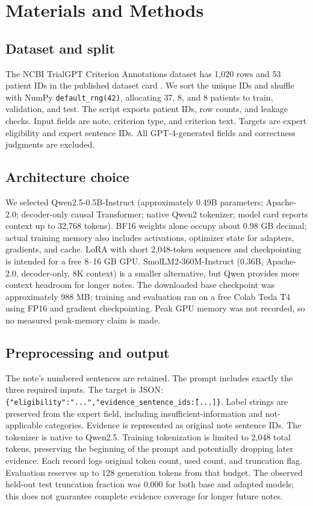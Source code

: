 \documentclass[conference]{IEEEtran}
\begin{document}
\section{Materials and Methods}
\subsection{Dataset and split}
The NCBI TrialGPT Criterion Annotations dataset has 1,020 rows and 53 patient IDs in the published dataset card \cite{trialgptdataset}. We sort the unique IDs and shuffle with NumPy \texttt{default\_rng(42)}, allocating 37, 8, and 8 patients to train, validation, and test. The script exports patient IDs, row counts, and leakage checks. Input fields are note, criterion type, and criterion text. Targets are expert eligibility and expert sentence IDs. All GPT-4-generated fields and correctness judgments are excluded.
\subsection{Architecture choice}
We selected Qwen2.5-0.5B-Instruct (approximately 0.49B parameters; Apache-2.0; decoder-only causal Transformer; native Qwen2 tokenizer; model card reports context up to 32,768 tokens). BF16 weights alone occupy about 0.98 GB decimal; actual training memory also includes activations, optimizer state for adapters, gradients, and cache. LoRA with short 2,048-token sequences and checkpointing is intended for a free 8--16 GB GPU. SmolLM2-360M-Instruct (0.36B, Apache-2.0, decoder-only, 8K context) is a smaller alternative, but Qwen provides more context headroom for longer notes. The downloaded base checkpoint was approximately 988 MB; training and evaluation ran on a free Colab Tesla T4 using FP16 and gradient checkpointing. Peak GPU memory was not recorded, so no measured peak-memory claim is made.
\subsection{Preprocessing and output}
The note's numbered sentences are retained. The prompt includes exactly the three required inputs. The target is JSON: \texttt{\{"eligibility":"...","evidence\_sentence\_ids\":[...]\}}. Label strings are preserved from the expert field, including insufficient-information and not-applicable categories. Evidence is represented as original note sentence IDs. The tokenizer is native to Qwen2.5. Training tokenization is limited to 2,048 total tokens, preserving the beginning of the prompt and potentially dropping later evidence. Each record logs original token count, used count, and truncation flag. Evaluation reserves up to 128 generation tokens from that budget. The observed held-out test truncation fraction was 0.000 for both base and adapted models; this does not guarantee complete evidence coverage for longer future notes.
\end{document}
